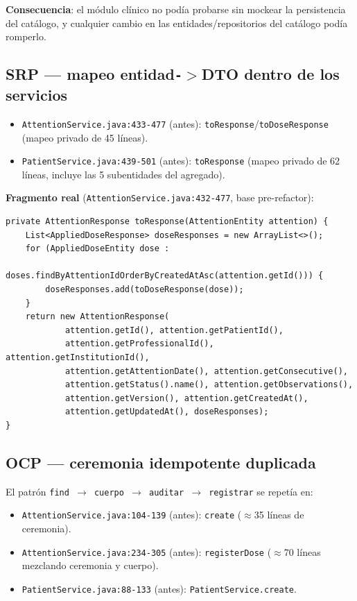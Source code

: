 \documentclass[11pt,a4paper]{article}
\begin{document}
\textbf{Consecuencia}: el módulo clínico no podía probarse sin mockear la
persistencia del catálogo, y cualquier cambio en las entidades/repositorios del
catálogo podía romperlo.

\subsection{SRP --- mapeo entidad\texttt{-}$>$DTO dentro de los servicios}

\begin{itemize}
  \item \texttt{AttentionService.java:433-477} (antes):
        \texttt{toResponse}/\texttt{toDoseResponse} (mapeo privado de 45
        líneas).
  \item \texttt{PatientService.java:439-501} (antes):
        \texttt{toResponse} (mapeo privado de 62 líneas, incluye las 5
        subentidades del agregado).
\end{itemize}

\textbf{Fragmento real} (\texttt{AttentionService.java:432-477}, base pre-refactor):

\begin{lstlisting}
private AttentionResponse toResponse(AttentionEntity attention) {
    List<AppliedDoseResponse> doseResponses = new ArrayList<>();
    for (AppliedDoseEntity dose :
            doses.findByAttentionIdOrderByCreatedAtAsc(attention.getId())) {
        doseResponses.add(toDoseResponse(dose));
    }
    return new AttentionResponse(
            attention.getId(), attention.getPatientId(),
            attention.getProfessionalId(), attention.getInstitutionId(),
            attention.getAttentionDate(), attention.getConsecutive(),
            attention.getStatus().name(), attention.getObservations(),
            attention.getVersion(), attention.getCreatedAt(),
            attention.getUpdatedAt(), doseResponses);
}
\end{lstlisting}

\subsection{OCP --- ceremonia idempotente duplicada}

El patrón \texttt{find $\to$ cuerpo $\to$ auditar $\to$ registrar} se repetía en:

\begin{itemize}
  \item \texttt{AttentionService.java:104-139} (antes):
        \texttt{create} ($\approx$35 líneas de ceremonia).
  \item \texttt{AttentionService.java:234-305} (antes):
        \texttt{registerDose} ($\approx$70 líneas mezclando ceremonia y cuerpo).
  \item \texttt{PatientService.java:88-133} (antes):
        \texttt{PatientService.create}.
\end{itemize}
\end{document}
